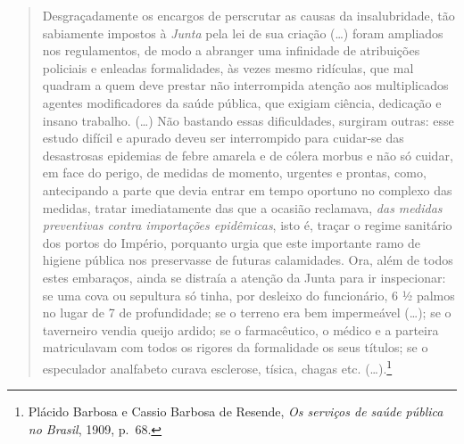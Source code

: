 \begin{quote}
Desgraçadamente os encargos de perscrutar as causas da insalubridade,
tão sabiamente impostos à \textit{Junta} pela lei de sua criação
(\ldots{}) foram ampliados nos regulamentos, de modo a abranger uma
infinidade de atribuições policiais e enleadas formalidades, às vezes
mesmo ridículas, que mal quadram a quem deve prestar não interrompida
atenção aos multiplicados agentes modificadores da saúde pública, que
exigiam ciência, dedicação e insano trabalho. (\ldots{}) Não bastando
essas dificuldades, surgiram outras: esse estudo difícil e apurado deveu
ser interrompido para cuidar-se das desastrosas epidemias de febre
amarela e de cólera morbus e não só cuidar, em face do perigo, de
medidas de momento, urgentes e prontas, como, antecipando a parte que
devia entrar em tempo oportuno no complexo das medidas, tratar
imediatamente das que a ocasião reclamava, \textit{das medidas preventivas
contra importações epidêmicas}, isto é, traçar o regime sanitário dos
portos do Império, porquanto urgia que este importante ramo de higiene
pública nos preservasse de futuras calamidades. Ora, além de todos estes
embaraços, ainda se distraía a atenção da Junta para ir inspecionar: se
uma cova ou sepultura só tinha, por desleixo do funcionário, 6 ½ palmos
no lugar de 7 de profundidade; se o terreno era bem impermeável (\dots{});
se o taverneiro vendia queijo ardido; se o farmacêutico, o médico e a
parteira matriculavam com todos os rigores da formalidade os seus
títulos; se o especulador analfabeto curava esclerose, tísica, chagas
etc. (\dots{}).\footnote{Plácido Barbosa e Cassio Barbosa de Resende,
  \textit{Os serviços de saúde pública no Brasil}, 1909, p.~68.}
\end{quote}

